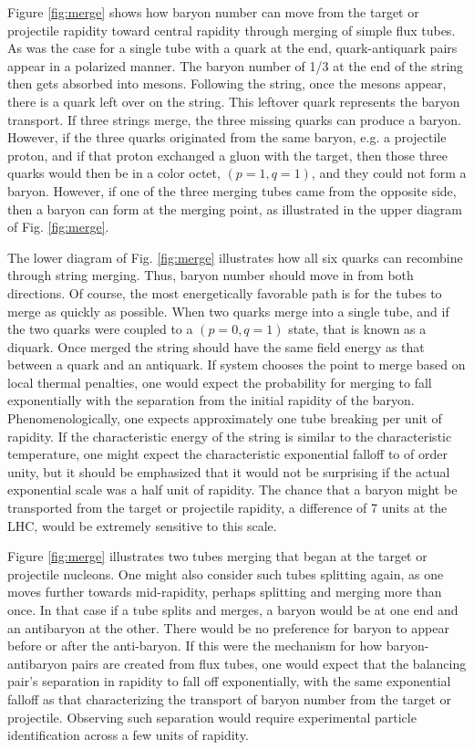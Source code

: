 \documentclass[aps, prc, 12pt, nofootinbib, showpacs, superscriptaddress, tightenlines, groupedaddress]{revtex4-2}
\begin{document}
Figure \ref{fig:merge} shows how baryon number can move from the target or projectile rapidity toward central rapidity through merging of simple flux tubes. As was the case for a single tube with a quark at the end, quark-antiquark pairs appear in a polarized manner. The baryon number of 1/3 at the end of the string then gets absorbed into mesons. Following the string, once the mesons appear, there is a quark left over on the string. This leftover quark represents the baryon transport. If three strings merge, the three missing quarks can produce a baryon. However, if the three quarks originated from the same baryon, e.g. a projectile proton, and if that proton exchanged a gluon with the target, then those three quarks would then be in a color octet, $(p=1,q=1)$, and they could not form a baryon. However, if one of the three merging tubes came from the opposite side, then a baryon can form at the merging point, as illustrated in the upper diagram of Fig. \ref{fig:merge}.

The lower diagram of Fig. \ref{fig:merge} illustrates how all six quarks can recombine through string merging. Thus, baryon number should move in from both directions. Of course, the most energetically favorable path is for the tubes to merge as quickly as possible. When two quarks merge into a single tube, and if the two quarks were coupled to a $(p=0,q=1)$ state, that is known as a diquark. Once merged the string should have the same field energy as that between a quark and an antiquark. If system chooses the point to merge based on local thermal penalties, one would expect the probability for merging to fall exponentially with the separation from the initial rapidity of the baryon. Phenomenologically, one expects approximately one tube breaking per unit of rapidity. If the characteristic energy of the string is similar to the characteristic temperature, one might expect the characteristic exponential falloff to of order unity, but it should be emphasized that it would not be surprising if the actual exponential scale was a half unit of rapidity. The chance that a baryon might be transported from the target or projectile rapidity, a difference of 7 units at the LHC, would be extremely sensitive to this scale.

Figure \ref{fig:merge} illustrates two tubes merging that began at the target or projectile nucleons. One might also consider such tubes splitting again, as one moves further towards mid-rapidity, perhaps splitting and merging more than once. In that case if a tube splits and merges, a baryon would be at one end and an antibaryon at the other. There would be no preference for baryon to appear before or after the anti-baryon. If this were the mechanism for how baryon-antibaryon pairs are created from flux tubes, one would expect that the balancing pair's separation in rapidity to fall off exponentially, with the same exponential falloff as that characterizing the transport of baryon number from the target or projectile. Observing such separation would require experimental particle identification across a few units of rapidity.
\end{document}

